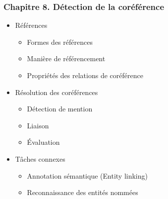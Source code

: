 \documentclass[11pt, a4paper]{article}
\begin{document}
\begin{tcolorbox}
\subsubsection*{Chapitre 8. Détection de la coréférence}

\begin{multicols}{2}
	\begin{itemize}
		
		\item Références
		\begin{itemize}
			\item Formes des références 
			\item Manière de référencement
			\item Propriétés des relations de coréférence
		\end{itemize}
	
		\item Résolution des coréférences
		\begin{itemize}
			\item Détection de mention
			\item Liaison
			\item Évaluation
		\end{itemize}
	
		\item Tâches connexes
		\begin{itemize}
			\item Annotation sémantique (Entity linking)
			\item Reconnaissance des entités nommées
		\end{itemize}
		
	\end{itemize}
\end{multicols}
\end{tcolorbox}
\end{document}
